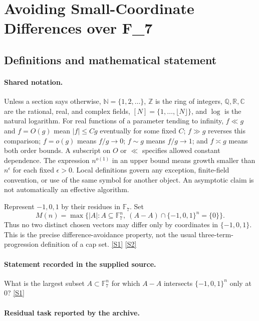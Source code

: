 \documentclass[11pt,a4paper]{article}
\newcommand{\N}{\mathbb{N}}
\newcommand{\Z}{\mathbb{Z}}
\newcommand{\Q}{\mathbb{Q}}
\newcommand{\R}{\mathbb{R}}
\newcommand{\C}{\mathbb{C}}
\newcommand{\F}{\mathbb{F}}
\newcommand{\sref}[2]{\hyperlink{source:#1:#2}{[S#2]}}
\begin{document}
\section{Avoiding Small-Coordinate Differences over F\_7}\label{statement}


\subsection{Definitions and mathematical statement}

\paragraph{Shared notation.}Unless a section says otherwise, $\N=\{1,2,\ldots\}$,
$\Z$ is the ring of integers, $\Q,\R,\C$ are the rational, real, and complex
fields, $[N]=\{1,\ldots,\lfloor N\rfloor\}$, and $\log$ is the natural
logarithm. For real functions of a parameter tending to infinity,
$f\ll g$ and $f=O(g)$ mean $|f|\leq Cg$ eventually for some fixed $C$;
$f\gg g$ reverses this comparison; $f=o(g)$ means $f/g\to0$;
$f\sim g$ means $f/g\to1$; and $f\asymp g$ means both order bounds.
A subscript on $O$ or $\ll$ specifies allowed constant dependence.
The expression $n^{o(1)}$ in an upper bound means growth smaller than
$n^\epsilon$ for each fixed $\epsilon>0$. Local definitions govern any
exception, finite-field convention, or use of the same symbol for another
object. An asymptotic claim is not automatically an effective algorithm.



Represent $-1,0,1$ by their residues in $\F_7$. Set
\[M(n)=\max\{|A|:A\subseteq\F_7^n,\ (A-A)\cap\{-1,0,1\}^n=\{0\}\}.\]
Thus no two distinct chosen vectors may differ only by coordinates in $\{-1,0,1\}$. This is the precise difference-avoidance property, not the usual three-term-progression definition of a cap set. \sref{statement}{1} \sref{statement}{2}

\paragraph{Statement recorded in the supplied source.}
What is the largest subset $A \subset \mathbb{F}_7^n$ for which $A - A$ intersects $\{-1, 0, 1\}^n$ only at 0? \sref{statement}{1}

\paragraph{Residual task reported by the archive.}
\end{document}

